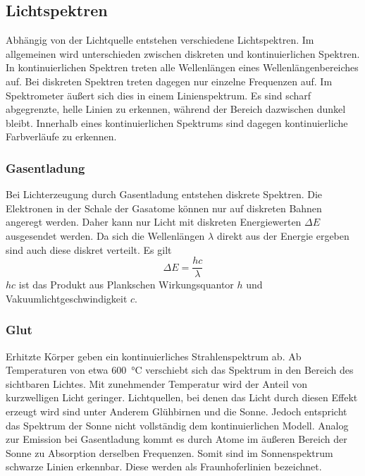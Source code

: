 \subsection{Lichtspektren}
Abhängig von der Lichtquelle entstehen verschiedene Lichtspektren. Im allgemeinen wird unterschieden zwischen diskreten und kontinuierlichen Spektren. In kontinuierlichen Spektren treten alle Wellenlängen eines Wellenlängenbereiches auf. Bei diskreten Spektren treten dagegen nur einzelne Frequenzen auf. Im Spektrometer äußert sich dies in einem Linienspektrum. Es sind  scharf abgegrenzte, helle Linien zu erkennen, während der Bereich dazwischen dunkel bleibt. Innerhalb eines kontinuierlichen Spektrums sind dagegen kontinuierliche Farbverläufe zu erkennen. 
\subsubsection{Gasentladung}
Bei Lichterzeugung durch Gasentladung entstehen diskrete Spektren. Die Elektronen in der Schale der Gasatome können nur auf diskreten Bahnen angeregt werden. Daher kann nur Licht mit diskreten Energiewerten $ \Delta E $ ausgesendet werden. Da sich die Wellenlängen $ \lambda $ direkt aus der Energie ergeben sind auch diese diskret verteilt. Es gilt
\begin{equation}
	\Delta E = \frac{hc}{\lambda}
\end{equation}
$ hc $ ist das Produkt aus Plankschen Wirkungsquantor $ h $ und Vakuumlichtgeschwindigkeit $ c $.

\subsubsection{Glut}
Erhitzte Körper geben ein kontinuierliches Strahlenspektrum ab. Ab Temperaturen von etwa \SI{600}{\degreeCelsius} verschiebt sich das Spektrum in den Bereich des sichtbaren Lichtes. Mit zunehmender Temperatur wird der Anteil von kurzwelligen Licht geringer. Lichtquellen, bei denen das Licht durch diesen Effekt erzeugt wird sind unter Anderem Glühbirnen und die Sonne. Jedoch entspricht das Spektrum der Sonne nicht vollständig dem kontinuierlichen Modell. Analog zur Emission bei Gasentladung kommt es durch Atome im äußeren Bereich der Sonne zu Absorption derselben Frequenzen. Somit sind im Sonnenspektrum schwarze Linien erkennbar. Diese werden als Fraunhoferlinien bezeichnet.

